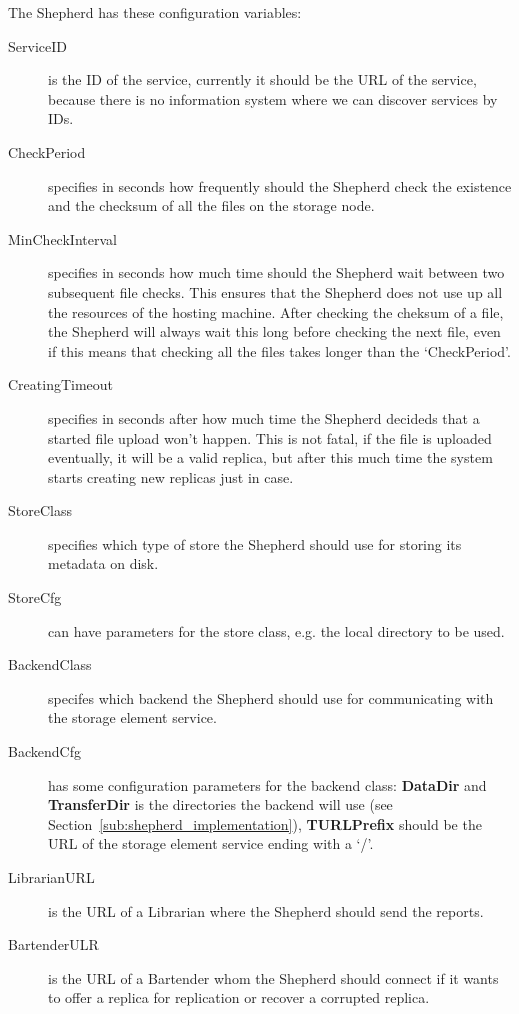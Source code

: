 \documentclass{book}
\begin{document}
The Shepherd has these configuration variables:

\begin{description}
    \item[ServiceID] is the ID of the service, currently it should be the URL of the service, because there is no information system where we can discover services by IDs.
    \item[CheckPeriod] specifies in seconds how frequently should the Shepherd check the existence and the checksum of all the files on the storage node.
    \item[MinCheckInterval] specifies in seconds how much time should the Shepherd wait between two subsequent file checks. This ensures that the Shepherd does not use up all the resources of the hosting machine. After checking the cheksum of a file, the Shepherd will always wait this long before checking the next file, even if this means that checking all the files takes longer than the `CheckPeriod'.
    \item[CreatingTimeout] specifies in seconds after how much time the Shepherd decideds that a started file upload won't happen. This is not fatal, if the file is uploaded eventually, it will be a valid replica, but after this much time the system starts creating new replicas just in case.
    \item[StoreClass] specifies which type of store the Shepherd should use for storing its metadata on disk.
    \item[StoreCfg] can have parameters for the store class, e.g. the local directory to be used.
    \item[BackendClass] specifes which backend the Shepherd should use for communicating with the storage element service.
    \item[BackendCfg] has some configuration parameters for the backend class: \textbf{DataDir} and \textbf{TransferDir} is the directories the backend will use (see Section~\ref{sub:shepherd_implementation}), \textbf{TURLPrefix} should be the URL of the storage element service ending with a `/'.
    \item[LibrarianURL] is the URL of a Librarian where the Shepherd should send the reports.
    \item[BartenderULR] is the URL of a Bartender whom the Shepherd should connect if it wants to offer a replica for replication or recover a corrupted replica.
\end{description}
\end{document}
